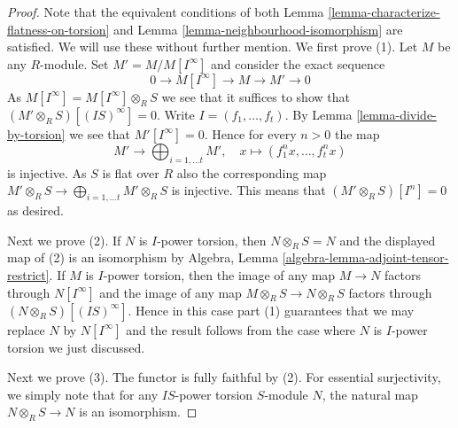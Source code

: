 \documentclass[10pt,a4paper]{amsart}
\theoremstyle{plain}
\theoremstyle{definition}
\theoremstyle{remark}
\numberwithin{equation}{subsection}
\begin{document}
\begin{proof}
Note that the equivalent conditions of both
Lemma \ref{lemma-characterize-flatness-on-torsion} and
Lemma \ref{lemma-neighbourhood-isomorphism}
are satisfied. We will use these without further mention.
We first prove (1). Let $M$ be any $R$-module.
Set $M' = M/M[I^\infty]$ and consider the exact sequence
$$
0 \to M[I^\infty] \to M \to M' \to 0
$$
As $M[I^\infty] = M[I^\infty] \otimes_R S$ we see that it suffices to
show that $(M' \otimes_R S)[(IS)^\infty] = 0$.
Write $I = (f_1, \ldots, f_t)$. By
Lemma \ref{lemma-divide-by-torsion}
we see that $M'[I^\infty] = 0$. Hence for every $n > 0$ the map
$$
M' \longrightarrow \bigoplus\nolimits_{i = 1, \ldots t} M',
\quad
x \longmapsto (f_1^n x, \ldots, f_t^n x)
$$
is injective. As $S$ is flat over $R$ also the corresponding map
$M' \otimes_R S \to \bigoplus_{i = 1, \ldots t} M' \otimes_R S$
is injective. This means that $(M' \otimes_R S)[I^n] = 0$ as desired.

\medskip\noindent
Next we prove (2). If $N$ is $I$-power torsion, then
$N \otimes_R S = N$ and the displayed map of (2) is an isomorphism by
Algebra, Lemma \ref{algebra-lemma-adjoint-tensor-restrict}.
If $M$ is $I$-power torsion, then the image of any map
$M \to N$ factors through $N[I^\infty]$ and the image of any map
$M \otimes_R S \to N \otimes_R S$ factors through
$(N \otimes_R S)[(IS)^\infty]$. Hence in this case
part (1) guarantees that we may replace $N$ by $N[I^\infty]$
and the result follows from the case where $N$ is $I$-power torsion
we just discussed.

\medskip\noindent
Next we prove (3). The functor is fully faithful by (2).
For essential surjectivity, we simply note that for any $IS$-power torsion
$S$-module $N$, the natural map $N \otimes_R S \to N$ is an isomorphism.
\end{proof}
\end{document}
